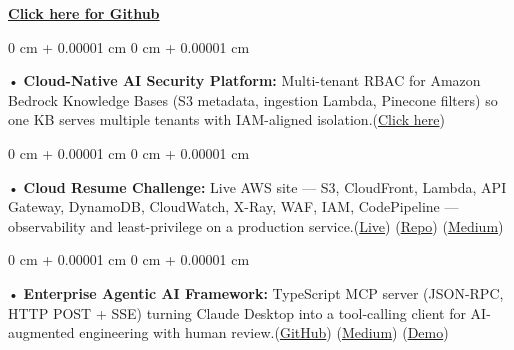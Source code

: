 \documentclass[10pt, letterpaper]{article}
\newenvironment{onecolentry}{
    \begin{adjustwidth}{
        0 cm + 0.00001 cm
    }{
        0 cm + 0.00001 cm
    }
}{
    \end{adjustwidth}
} %
\begin{document}
\textbf{\href{https://github.com/daedalus-s}{Click here for Github}}
\begin{onecolentry}
     • \textbf{Cloud-Native AI Security Platform:} Multi-tenant RBAC for Amazon Bedrock Knowledge Bases (S3 metadata, ingestion Lambda, Pinecone filters) so one KB serves multiple tenants with IAM-aligned isolation.(\href{https://github.com/daedalus-s/bedrock-acl-metadata}{Click here})
\end{onecolentry}
\begin{onecolentry}
     • \textbf{Cloud Resume Challenge:} Live AWS site --- S3, CloudFront, Lambda, API Gateway, DynamoDB, CloudWatch, X-Ray, WAF, IAM, CodePipeline --- observability and least-privilege on a production service.(\href{https://sreenikethaathreya.com}{Live}) (\href{https://github.com/daedalus-s/resume-website}{Repo}) (\href{https://medium.com/@sreenikethaathreya/cloud-resume-challenge-c4f17c3d53ff}{Medium})
\end{onecolentry}
\begin{onecolentry}
     • \textbf{Enterprise Agentic AI Framework:} TypeScript MCP server (JSON-RPC, HTTP POST + SSE) turning Claude Desktop into a tool-calling client for AI-augmented engineering with human review.(\href{https://github.com/daedalus-s/dota2-mcp-server}{GitHub}) (\href{https://medium.com/@sreenikethaathreya/get-good-at-using-ai-noob-5d2576203112}{Medium}) (\href{https://www.youtube.com/watch?v=op2gTYyFb5U}{Demo})
\end{onecolentry}
\vspace{2 pt }
        \vspace{2 pt }
\end{document}
